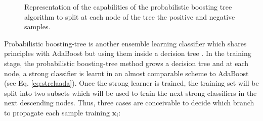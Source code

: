 \begin{figure}
\centering
\caption{Representation of the capabilities of the probabilistic boosting tree algorithm to split at each node of the tree the positive and negative samples.}
\label{fig:pbtsim}
\end{figure}

Probabilistic boosting-tree is another ensemble learning classifier which shares principles with AdaBoost but using them inside a decision tree \cite{Tu2005}. 
In the training stage, the probabilistic boosting-tree method grows a decision tree and at each node, a strong classifier is learnt in an almost comparable scheme to AdaBoost (see Eq. \ref{eq:strclaada}).
Once the strong learner is trained, the training set will be split into two subsets which will be used to train the next strong classifiers in the next descending nodes.
Thus, three cases are conceivable to decide which branch to propagate each sample training $\mathbf{x}_i$:

